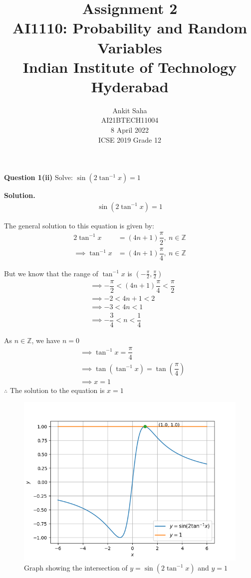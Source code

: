\documentclass[journal,12pt,twocolumn]{IEEEtran}
\title{Assignment 2 \\ \Large AI1110: Probability and Random Variables \\ \large Indian Institute of Technology Hyderabad}
\author{Ankit Saha \\ \normalsize AI21BTECH11004 \\ \vspace*{20pt} \normalsize  8 April 2022 \\ \vspace*{20pt} \Large ICSE 2019 Grade 12}
\begin{document}
	\maketitle
	
	\textbf{Question 1(ii)} 
	Solve: $\sin(2\tan^{-1}x) = 1$
	
	\textbf{Solution.}		
	\begin{align}
		\sin(2\tan^{-1}x) = 1
	\end{align}
	
	The general solution to this equation is given by:
	\begin{align}
		2\tan^{-1}x &= (4n + 1)\dfrac{\pi}{2},~n \in \mathbb{Z} \\
		\implies \tan^{-1}x &= (4n + 1)\dfrac{\pi}{4},~n \in \mathbb{Z}
	\end{align}
	
	But we know that the range of $\tan^{-1}x$ is $\left( -\frac{\pi}{2}, \frac{\pi}{2} \right)$
	\begin{align}
		&\implies -\dfrac{\pi}{2} < (4n + 1)\dfrac{\pi}{4} < \dfrac{\pi}{2} \\
		&\implies -2 < 4n + 1 < 2 \\
		&\implies -3 < 4n < 1 \\
		&\implies -\dfrac{3}{4} < n < \dfrac{1}{4}
	\end{align}
			
	As $n \in \mathbb{Z}$, we have $n = 0$
	\begin{align}
		&\implies \tan^{-1}x = \dfrac{\pi}{4} \\
		&\implies \tan(\tan^{-1}x) = \tan\left(\dfrac{\pi}{4}\right) \\ 
		&\implies x = 1
	\end{align}
	$\therefore$ The solution to the equation is $x = 1$
	
	\begin{figure}[!ht]
		\centering
		\includegraphics[width=\columnwidth]{figs/fig-1.png}
		\caption{Graph showing the intersection of $y = \sin(2\tan^{-1}x)$ and $y = 1$}
		\label{fig-1}
	\end{figure}
	
\end{document}
